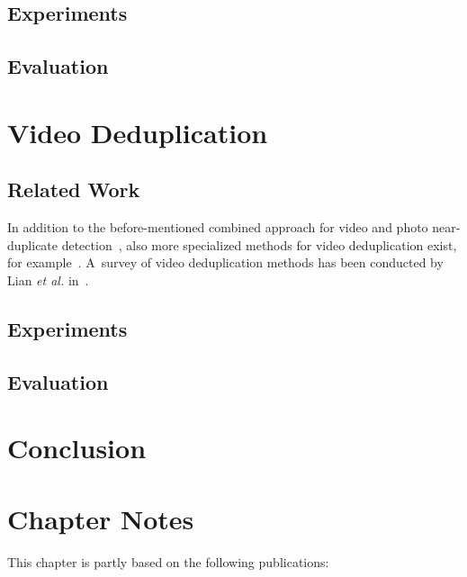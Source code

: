 \subsection{Experiments}

\subsection{Evaluation}

\section{Video Deduplication}

\subsection{Related Work}

In addition to the before-mentioned  combined approach
for video and photo near-duplicate
detection~\cite{yang2009nearduplicate}, also more
specialized methods for video deduplication exist,
for example~\cite{min2011nearduplicatevideo,wu2009nearduplicate}.
A~survey of video deduplication methods has been conducted by
Lian \emph{et al.} in~\cite{lian2010survey}.

\subsection{Experiments}

\subsection{Evaluation}

\section{Conclusion}

\section*{Chapter Notes}
This chapter is partly based on the following publications:

